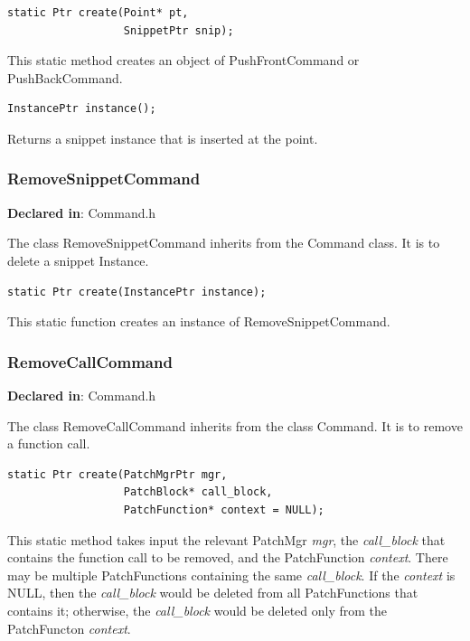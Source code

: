 \documentclass[11pt]{article}
\begin{document}
\begin{verbatim}
static Ptr create(Point* pt,
                  SnippetPtr snip);

\end{verbatim}



This static method creates an object of PushFrontCommand or PushBackCommand.


\begin{verbatim}
InstancePtr instance();

\end{verbatim}



Returns a snippet instance that is inserted at the point.

\subsubsection{RemoveSnippetCommand}
\label{sec-3.3.2}

\textbf{Declared in}: Command.h

The class RemoveSnippetCommand inherits from the Command class. It is to delete
a snippet Instance.


\begin{verbatim}
static Ptr create(InstancePtr instance);

\end{verbatim}



This static function creates an instance of RemoveSnippetCommand.

\subsubsection{RemoveCallCommand}
\label{sec-3.3.3}

\textbf{Declared in}: Command.h

The class RemoveCallCommand inherits from the class Command. It is to remove a
function call.


\begin{verbatim}
static Ptr create(PatchMgrPtr mgr,
                  PatchBlock* call_block,
                  PatchFunction* context = NULL);

\end{verbatim}



This static method takes input the relevant PatchMgr \emph{mgr}, the \emph{call\_block}
that contains the function call to be removed, and the PatchFunction \emph{context}.
There may be multiple PatchFunctions containing the same \emph{call\_block}. If the
\emph{context} is NULL, then the \emph{call\_block} would be deleted from all
PatchFunctions that contains it; otherwise, the \emph{call\_block} would be deleted
only from the PatchFuncton \emph{context}.
\end{document}
